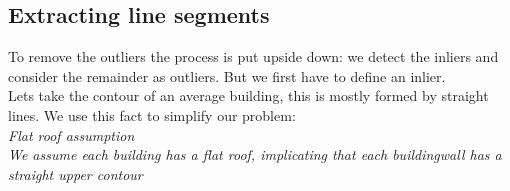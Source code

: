 \documentclass[10pt]{article}
\begin{document}



\subsection{Extracting line segments}

%


	To remove the outliers the process is put upside down: we detect the
	inliers and consider the remainder as outliers. But we first have to define an inlier.\\
	Lets take the contour of an average building, this is mostly formed by
	straight lines. We use this fact to simplify our problem:\\
	\emph{Flat roof assumption}\\
	\emph{We assume each building has a flat roof, implicating that each buildingwall
	has a straight upper contour}
\end{document}
